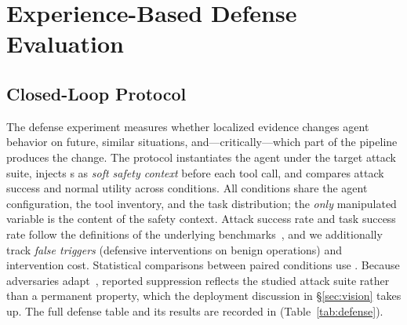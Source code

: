 \section{Experience-Based Defense Evaluation}
\label{sec:defense}

\subsection{Closed-Loop Protocol}
The defense experiment measures whether localized evidence changes agent behavior on future, similar situations, and---critically---which part of the pipeline produces the change. The protocol instantiates the agent under the target attack suite, injects \sexp{}s as \emph{soft safety context} before each tool call, and compares attack success and normal utility across conditions. All conditions share the agent configuration, the tool inventory, and the task distribution; the \emph{only} manipulated variable is the content of the safety context. Attack success rate and task success rate follow the definitions of the underlying benchmarks~\cite{debenedetti2024agentdojo,zhan2024injecagent,tur2025safearena,levy2024stwebagentbench}, and we additionally track \emph{false triggers} (defensive interventions on benign operations) and intervention cost. Statistical comparisons between paired conditions use . Because adversaries adapt~\cite{zhan2025adaptive,syros2026muzzle}, reported suppression reflects the studied attack suite rather than a permanent property, which the deployment discussion in \S\ref{sec:vision} takes up. The full defense table and its results are recorded in  (Table~\ref{tab:defense}).

\begin{table}[t]
\caption{Defense conditions and outcomes. Conditions differ only in the safety-context content; numbers are completed from the experiments.}
\label{tab:defense}
\end{table}

